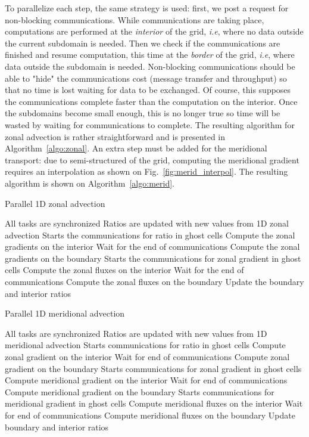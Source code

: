 To parallelize each step, the same strategy is used: first, we post a request
for non-blocking communications. While communications are taking place,
computations are performed at the \textit{interior} of the grid, \textit{i.e},
where no data outside the current subdomain is needed. Then we check if the
communications are finished and resume computation, this time at the
\textit{border} of the grid, \textit{i.e}, where data outside the subdomain is
needed. Non-blocking communications should be able to "hide" the communications
cost (message transfer and throughput) so that no time is lost waiting for data
to be exchanged. Of course, this supposes the communications
complete faster than the computation on the interior. Once the subdomains become
small enough, this is no longer true so time will be wasted by waiting for
communications to complete.
The resulting algorithm for zonal advection is rather straightforward and is
presented in Algorithm~\ref{algo:zonal}. An extra step must be added for the
meridional transport: due to semi-structured of the grid, computing the
meridional gradient requires an interpolation as shown on
Fig.~\ref{fig:merid_interpol}. The resulting algorithm is shown on
Algorithm~\ref{algo:merid}.
\begin{algorithm}
  \caption{Parallel 1D zonal advection}
  \label{algo:zonal}
  \begin{algorithmic}
    \Require All tasks are synchronized
    \Ensure Ratios are updated with new values from 1D zonal advection
    \State Starts the communications for ratio in ghost cells 
    \State Compute the zonal gradients on the interior
    \State Wait for the end of communications
    \State Compute the zonal gradients on the boundary
    \State
    \State Starts the communications for zonal gradient in ghost cells
    \State Compute the zonal fluxes on the interior
    \State Wait for the end of communications
    \State Compute the zonal fluxes on the boundary
    \State
    \State Update the boundary and interior ratios
  \end{algorithmic}
\end{algorithm}

\begin{algorithm}  
  \caption{Parallel 1D meridional advection}
  \label{algo:merid}
  \begin{algorithmic}
    \Require All tasks are synchronized
    \Ensure Ratios are updated with new values from 1D meridional advection
    \State Starts communications for ratio in ghost cells 
    \State Compute zonal gradient on the interior
    \State Wait for end of communications
    \State Compute zonal gradient on the boundary
    \State
    \State Starts communications for zonal gradient in ghost cells
    \State Compute meridional gradient on the interior
    \State Wait for end of communications
    \State Compute meridional gradient on the boundary
    \State
    \State Starts communications for meridional gradient in ghost cells
    \State Compute meridional fluxes on the interior
    \State Wait for end of communications
    \State Compute meridional fluxes on the boundary
    \State
    \State Update boundary and interior ratios
  \end{algorithmic}
\end{algorithm}


